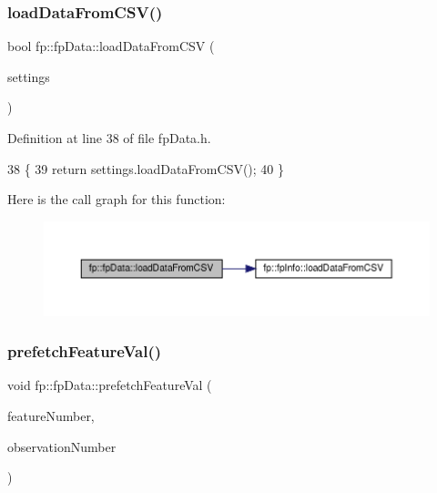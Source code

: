 \subsubsection{\texorpdfstring{load\+Data\+From\+C\+S\+V()}{loadDataFromCSV()}}
{\footnotesize\ttfamily bool fp\+::fp\+Data\+::load\+Data\+From\+C\+SV (\begin{DoxyParamCaption}\item[{\hyperlink{classfp_1_1fpInfo}{fp\+Info} \&}]{settings }\end{DoxyParamCaption})\hspace{0.3cm}{\ttfamily [inline]}}



Definition at line 38 of file fp\+Data.\+h.


\begin{DoxyCode}
38                                                          \{
39                 \textcolor{keywordflow}{return} settings.loadDataFromCSV();
40             \}
\end{DoxyCode}
Here is the call graph for this function\+:\nopagebreak
\begin{figure}[H]
\begin{center}
\leavevmode
\includegraphics[width=350pt]{classfp_1_1fpData_a2b4d9be328aaa7acf9a2561150da0402_cgraph}
\end{center}
\end{figure}
\mbox{\label{classfp_1_1fpData_a3f9645ca93e9b64a788b3042e9e41fcc}} 
\subsubsection{\texorpdfstring{prefetch\+Feature\+Val()}{prefetchFeatureVal()}}
{\footnotesize\ttfamily void fp\+::fp\+Data\+::prefetch\+Feature\+Val (\begin{DoxyParamCaption}\item[{const int}]{feature\+Number,  }\item[{const int}]{observation\+Number }\end{DoxyParamCaption})\hspace{0.3cm}{\ttfamily [inline]}}



